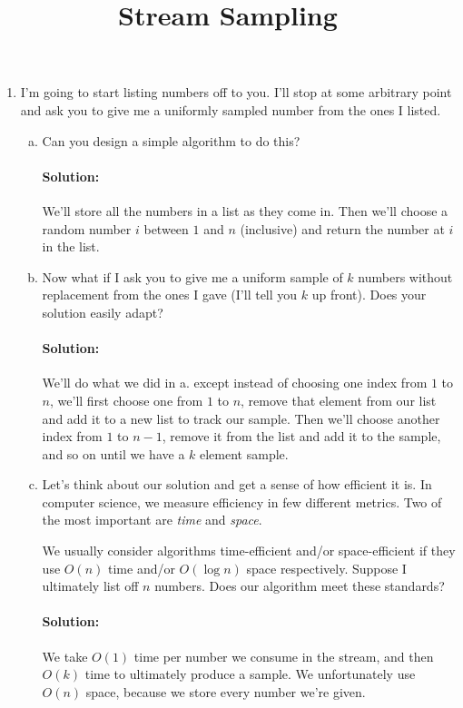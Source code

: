 \documentclass{article}
\title{Stream Sampling}
\author{}
\date{}
\begin{document}
\maketitle
\thispagestyle{fancy}

\doublespacing

\begin{enumerate}[1.]
\item %
  I'm going to start listing numbers off to you. I'll stop at some arbitrary
  point and ask you to give me a uniformly sampled number from the ones I
  listed.
  \begin{enumerate}[a.]
  \item %
    Can you design a simple algorithm to do this?

    \paragraph{Solution:} We'll store all the numbers in a list as they
    come in. Then we'll choose a random number $i$ between $1$ and $n$ (inclusive)
    and return the number at $i$ in the list.
  \item %
    Now what if I ask you to give me a uniform sample of $k$ numbers without
    replacement from the ones I gave (I'll tell you $k$ up front). Does your
    solution easily adapt?

    \paragraph{Solution:} We'll do what we did in a. except instead of choosing
    one index from $1$ to $n$, we'll first choose one from $1$ to $n$, remove
    that element from our list and add it to a new list to track our sample.
    Then we'll choose another index from $1$ to $n-1$, remove it from the list
    and add it to the sample, and so on until we have a $k$ element sample.

  \item %
    Let's think about our solution and get a sense of how efficient it is. In
    computer science, we measure efficiency in few different metrics. Two of the
    most important are \textit{time} and \textit{space}.

    We usually consider algorithms time-efficient and/or space-efficient if they
    use $O(n)$ time and/or $O(\log n)$ space respectively. Suppose I ultimately
    list off $n$ numbers. Does our algorithm meet these standards?

    \paragraph{Solution:} We take $O(1)$ time per number we consume in the
    stream, and then $O(k)$ time to ultimately produce a sample. We
    unfortunately use $O(n)$ space, because we store every number we're given.
  \end{enumerate}


\end{enumerate}
\end{document}
